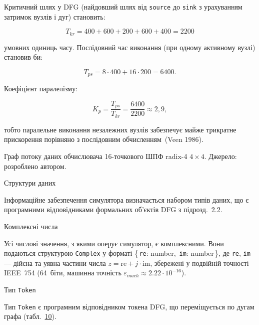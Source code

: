 Критичний шлях у DFG (найдовший шлях від \texttt{source} до
\texttt{sink} з урахуванням затримок вузлів і дуг) становить:

\[T_{kr} = 400 + 600 + 200 + 600 + 400 = 2200\]

умовних одиниць часу. Послідовний час виконання (при одному активному
вузлі) становив би:

\[T_{ps} = 8 \cdot 400 + 16 \cdot 200 = 6400.\]

Коефіцієнт паралелізму:

\[K_{p} = \frac{T_{ps}}{T_{kr}} = \frac{6400}{2200} \approx 2,9,\]

тобто паралельне виконання незалежних вузлів забезпечує майже трикратне
прискорення порівняно з послідовним обчисленням~(Veen 1986).

Граф потоку даних обчислювача 16-точкового ШПФ radix-4 \(4 \times 4\).
Джерело: розроблено автором.

\protect{}\label{_Toc228121462}{}Структури даних

Інформаційне забезпечення симулятора визначається набором типів даних,
що є програмними відповідниками формальних об'єктів DFG з підрозд.~2.2.

Комплексні числа

Усі числові значення, з якими оперує симулятор, є комплексними. Вони
подаються структурою \texttt{Complex} у форматі \{ \texttt{re}:
number,~\texttt{im}: number \}, де \texttt{re}, \texttt{im} --- дійсна
та уявна частини числа \(z = \text{re} + j \cdot \text{im}\), збережені
у подвійній точності IEEE~754 (64~біти, машинна точність
\(\varepsilon_{mach} \approx 2.22 \cdot 10^{- 16}\)).

Тип \texttt{Token}

Тип \texttt{Token} є програмним відповідником токена DFG, що
переміщується по дугам графа (табл.~\hyperref[tab:token]{10}).

